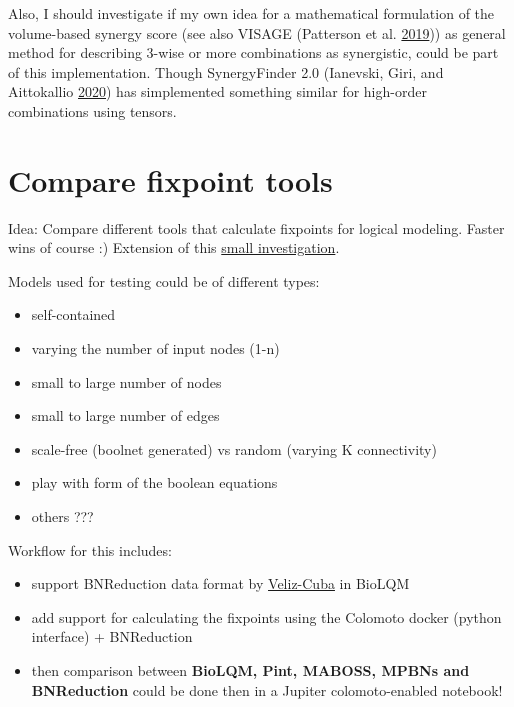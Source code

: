 \documentclass[
  12pt,
]{book}
\providecommand{\tightlist}{%
  \setlength{\itemsep}{0pt}\setlength{\parskip}{0pt}}
\begin{document}
Also, I should investigate if my own idea for a mathematical formulation of the volume-based synergy score (see also VISAGE (Patterson et al. \protect\hyperlink{ref-Patterson2019}{2019})) as general method for describing 3-wise or more combinations as synergistic, could be part of this implementation.
Though SynergyFinder 2.0 (Ianevski, Giri, and Aittokallio \protect\hyperlink{ref-Ianevski2020}{2020}) has simplemented something similar for high-order combinations using tensors.

\hypertarget{comp}{%
\section*{Compare fixpoint tools}\label{comp}}

Idea: Compare different tools that calculate fixpoints for logical modeling.
Faster wins of course :) Extension of this \protect\hyperlink{http:ux2fux2ftiny.ccux2fattr-tool-cmp}{small investigation}.

Models used for testing could be of different types:

\begin{itemize}
\tightlist
\item
  self-contained
\item
  varying the number of input nodes (1-n)
\item
  small to large number of nodes
\item
  small to large number of edges
\item
  scale-free (boolnet generated) vs random (varying K connectivity)
\item
  play with form of the boolean equations
\item
  others ???
\end{itemize}

Workflow for this includes:

\begin{itemize}
\tightlist
\item
  support BNReduction data format by \href{https://doi.org/10.1186/1471-2105-15-221}{Veliz-Cuba}
  in BioLQM
\item
  add support for calculating the fixpoints using the Colomoto docker (python
  interface) + BNReduction
\item
  then comparison between \textbf{BioLQM, Pint, MABOSS, MPBNs and BNReduction} could be done then
  in a Jupiter colomoto-enabled notebook!
\end{itemize}
\end{document}

